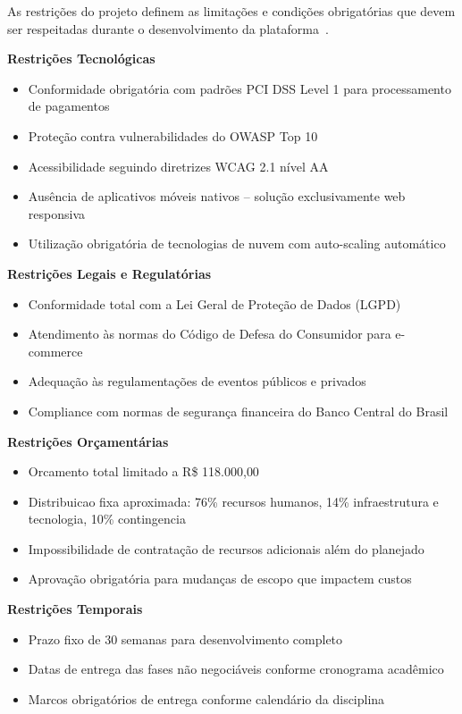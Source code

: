 As restrições do projeto definem as limitações e condições obrigatórias que devem ser respeitadas durante o desenvolvimento da plataforma~\cite{Sommerville:2016}.

\textbf{Restrições Tecnológicas}
\begin{itemize}
    \item Conformidade obrigatória com padrões PCI DSS Level 1 para processamento de pagamentos~\cite{PCIDSS:2022}
    \item Proteção contra vulnerabilidades do OWASP Top 10~\cite{OWASP:2021}
    \item Acessibilidade seguindo diretrizes WCAG 2.1 nível AA~\cite{WCAG:2018}
    \item Ausência de aplicativos móveis nativos -- solução exclusivamente web responsiva
    \item Utilização obrigatória de tecnologias de nuvem com auto-scaling automático
\end{itemize}

\textbf{Restrições Legais e Regulatórias}
\begin{itemize}
    \item Conformidade total com a Lei Geral de Proteção de Dados (LGPD)~\cite{LGPD:2018}
    \item Atendimento às normas do Código de Defesa do Consumidor para e-commerce
    \item Adequação às regulamentações de eventos públicos e privados
    \item Compliance com normas de segurança financeira do Banco Central do Brasil
\end{itemize}

\textbf{Restrições Orçamentárias}
\begin{itemize}
    \item Orcamento total limitado a R\$ 118.000{,}00
    \item Distribuicao fixa aproximada: 76\% recursos humanos, 14\% infraestrutura e tecnologia, 10\% contingencia
    \item Impossibilidade de contratação de recursos adicionais além do planejado
    \item Aprovação obrigatória para mudanças de escopo que impactem custos
\end{itemize}

\textbf{Restrições Temporais}
\begin{itemize}
    \item Prazo fixo de 30 semanas para desenvolvimento completo
    \item Datas de entrega das fases não negociáveis conforme cronograma acadêmico
    \item Marcos obrigatórios de entrega conforme calendário da disciplina
\end{itemize}

